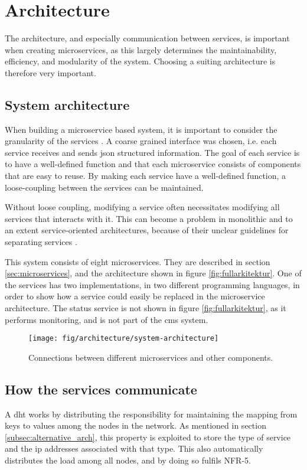\chapter{Architecture}
\label{chapterArchitecture}

The architecture, and especially communication between services, is important when creating microservices, as this largely determines the maintainability, efficiency, and modularity of the system.
Choosing a suiting architecture is therefore very important.

\section{System architecture}
When building a microservice based system, it is important to consider the granularity of the services \citep{granularity}. A coarse grained interface was chosen, i.e. each service receives and sends \acrshort{json} structured information. The goal of each service is to have a well-defined function and that each microservice consists of components that are easy to reuse. By making each service have a well-defined function, a loose-coupling between the services can be maintained.

Without loose coupling, modifying a service often necessitates modifying all services that interacts with it. This can become a problem in monolithic and to an extent service-oriented architectures, because of their unclear guidelines for separating services \citep{ibmSoaDescription}.

This system consists of eight microservices. They are described in section \ref{sec:microservices}, and the architecture shown in figure \ref{fig:fullarkitektur}. One of the services has two implementations, in two different programming languages, in order to show how a service could easily be replaced in the microservice architecture. The status service is not shown in figure \ref{fig:fullarkitektur}, as it performs monitoring, and is not part of the \acrshort{cms} system.


\begin{figure}[H]
    \centering
     \texttt{[image: fig/architecture/system-architecture]}
    \caption{Connections between different microservices and other components.}
\end{figure}\label{fig:fullarkitektur}

\section{How the services communicate}
A \acrshort{dht} works by distributing the responsibility for maintaining the mapping from keys to values among the nodes in the network. As  mentioned in section \ref{subsec:alternative_arch}, this property is exploited to store the type of service and the \acrshort{ip} addresses associated with that type. This also automatically distributes the load among all nodes, and by doing so fulfils NFR-5.

